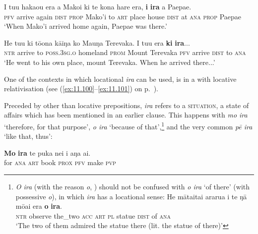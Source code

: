 \ea\label{ex:4.233}
\gll I tu{\ꞌ}u haka{\ꞌ}ou era a Mako{\ꞌ}i ki te kona hare era, \textbf{{\ꞌ}i} \textbf{ira} a Paepae.  \\
\textsc{pfv} arrive again \textsc{dist} \textsc{prop} Mako’i to \textsc{art} place house \textsc{dist} at \textsc{ana} \textsc{prop} Paepae  \\

\glt 
‘When Mako’i arrived home again, Paepae was there.’ \textstyleExampleref{[R214.071]} 
\z

\ea\label{ex:4.234}
\gll He tu{\ꞌ}u ki tō{\ꞌ}ona kāiŋa ko Ma{\ꞌ}uŋa Terevaka. I tu{\ꞌ}u era \textbf{ki} \textbf{ira}...\\
\textsc{ntr} arrive to \textsc{poss.3sg.o} homeland \textsc{prom} Mount Terevaka \textsc{pfv} arrive \textsc{dist} to \textsc{ana}\\

\glt
‘He went to his own place, mount Terevaka. When he arrived there...’ \textstyleExampleref{[R314.159–160]}
\z

One of the contexts in which locational \textit{ira} can be used, is in a  with locative relativisation (see (\ref{ex:11.100}–\ref{ex:11.101}) on p.~\pageref{ex:11.100}).

Preceded by other than locative prepositions, \textit{ira} refers to a \textsc{situation}, a state of affairs which has been mentioned in an earlier clause. This happens with \textit{mo ira} ‘therefore, for that purpose’, \textit{{\ꞌ}o ira} ‘because of that’,\footnote{\label{fn:227}\textit{{\ꞌ}O ira} (with the reason  \textit{{\ꞌ}o}, ) should not be confused with \textit{o ira} ‘of there’ (with possessive \textit{o}), in which \textit{ira} has a locational sense:
\ea
\gll 
He māta{\ꞌ}ita{\ꞌ}i ararua i te ŋā mōai era \textbf{o} \textbf{ira}.\\
  \textsc{ntr} observe the\_two \textsc{acc} \textsc{art} \textsc{pl} statue \textsc{dist} of \textsc{ana}\\
  \glt 
  ‘The two of them admired the statue there (lit. the statue of there)’ \textstyleExampleref{[R478.044]}\z  } and the very common \textit{pē ira} ‘like that, thus’:

\ea\label{ex:4.235}
\gll \textbf{Mo} \textbf{ira} te puka nei i aŋa ai. \\
for \textsc{ana} \textsc{art} book \textsc{prox} \textsc{pfv} make \textsc{pvp} \\

